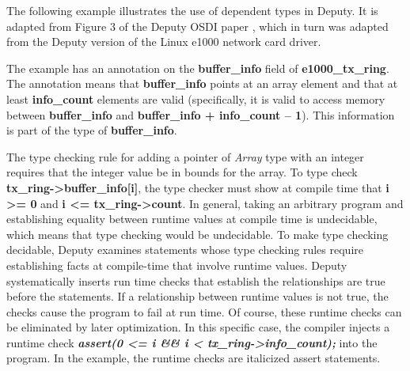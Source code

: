 \documentclass[]{article}
\begin{document}
The following example illustrates the use of dependent types in Deputy.
It is adapted from Figure 3 of the Deputy OSDI paper , which in turn was
adapted from the Deputy version of the Linux e1000 network card driver.

The example has an annotation on the \textbf{buffer\_info} field of
\textbf{e1000\_tx\_ring}. The annotation means that
\textbf{buffer\_info} points at an array element and that at least
\textbf{info\_count} elements are valid (specifically, it is valid to
access memory between \textbf{buffer\_info} and \textbf{buffer\_info +
info\_count -- 1}). This information is part of the type of
\textbf{buffer\_info}.

The type checking rule for adding a pointer of \emph{Array} type with an
integer requires that the integer value be in bounds for the array. To
type check \textbf{tx\_ring-\textgreater{}buffer\_info{[}i{]}}, the type
checker must show at compile time that \textbf{i \textgreater{}= 0} and
\textbf{i \textless{}= tx\_ring-\textgreater{}count}. In general, taking
an arbitrary program and establishing equality between runtime values at
compile time is undecidable, which means that type checking would be
undecidable. To make type checking decidable, Deputy examines statements
whose type checking rules require establishing facts at compile-time
that involve runtime values. Deputy systematically inserts run time
checks that establish the relationships are true before the statements.
If a relationship between runtime values is not true, the checks cause
the program to fail at run time. Of course, these runtime checks can be
eliminated by later optimization. In this specific case, the compiler
injects a runtime check \emph{\textbf{assert(0 \textless{}= i \&\& i
\textless{} tx\_ring-\textgreater{}info\_count);}} into the program. In
the example, the runtime checks are italicized assert statements.
\end{document}
